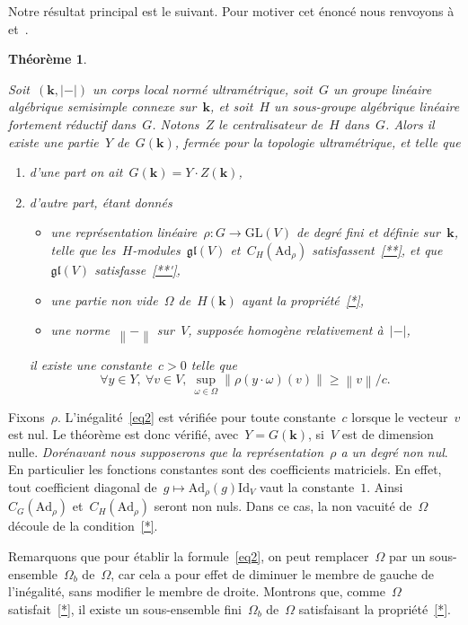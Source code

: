 \documentclass[french]{amsart}
\newcommand{\kk}{\mathbf{k}}
\newcommand{\abs}[1]{{\left|{#1}\right|}}
\newcommand{\GL}{\mathrm{GL}}
\newcommand{\Ad}{\mathrm{Ad}}
\newcommand{\lie}[1]{{\mathfrak{#1}}}
\newcommand{\gl}{\lie{gl}}
\newcommand{\Id}{\mathrm{Id}}
\newtheorem{theoreme}{Théorème}[section]
\newcommand{\Nm}[1]{{\left\|{#1}\right\|}}
\begin{document}
Notre résultat principal est le suivant. Pour motiver cet énoncé nous ren\-voy\-ons à~\cite{RS09} et~\cite{Ric09}.
\begin{theoreme}\label{Theo11}

Soit~$(\kk,\abs{-})$ un corps local normé ultramétrique, soit~$G$ un groupe linéaire algébrique semisimple connexe sur~$\kk$, et soit~$H$ un sous-groupe algébrique linéaire fortement réductif dans~$G$. Notons~$Z$ le centralisateur de~$H$ dans~$G$. Alors il existe une partie~$Y$ de~$G(\kk)$, fermée pour la topologie ultramétrique, et telle que
\begin{enumerate}[label=\textrm{\arabic*}.]
\item[\textup{1.}] d'une part on ait~$G(\kk)=Y\cdot Z(\kk)$,
\item[\textup{2.}] d'autre part, étant donnés
\begin{itemize}
\item une représentation linéaire~$\rho:G\rightarrow \GL(V)$ de degré fini et définie sur~$\kk$, telle que les~$H$-modules~$\gl(V)$ et~$C_H(\Ad_\rho)$ satisfassent~\eqref{**}, et que~$\lie{gl}(V)$ satisfasse~\eqref{**'},
\item une partie non vide~$\Omega$ de~$H(\kk)$ ayant la propriété~\eqref{*},
\item une norme~$\Nm{-}$ sur~$V$, supposée homogène relativement à~$\abs{-}$,
\end{itemize}
il existe une constante~$c>0$ telle que
\begin{equation}\label{eq2}
\forall y\in Y,~\forall v\in V,~\sup_{\omega\in\Omega}\Nm{\rho(y\cdot \omega)(v)}\geq\Nm{v}/c.
\end{equation}
\end{enumerate}
\end{theoreme}

Fixons~$\rho$. L'inégalité~\eqref{eq2} est vérifiée pour toute constante~$c$ lorsque le vecteur~$v$
est nul. Le théorème est donc vérifié, avec~$Y = G(\kk)$, si~$V$ est de dimension nulle.
\emph{Dorénavant nous supposerons que la représentation~$\rho$ a un degré non nul}. \label{constantes coeffs}	En particulier les fonctions constantes sont des coefficients matriciels. En effet, tout coefficient diagonal de~$g\mapsto \Ad_\rho(g)\Id_V$ vaut la constante~$1$. Ainsi~$C_G(\Ad_\rho)$ et~$C_H(\Ad_\rho)$ seront non nuls. Dans ce cas, la non vacuité de~$\Omega$ découle de la
condition~\eqref{*}.

Remarquons que pour établir la formule~\eqref{eq2}, on peut remplacer~$\Omega$ par un sous-ensemble~$\Omega_b$ de~$\Omega$, car cela a pour effet de diminuer le membre de gauche de l'inégalité, sans modifier le membre de droite. Montrons que, comme~$\Omega$ satisfait~\eqref{*}, il
existe un sous-ensemble fini~$\Omega_b$ de~$\Omega$ satisfaisant la propriété~\eqref{*}.
\end{document}
